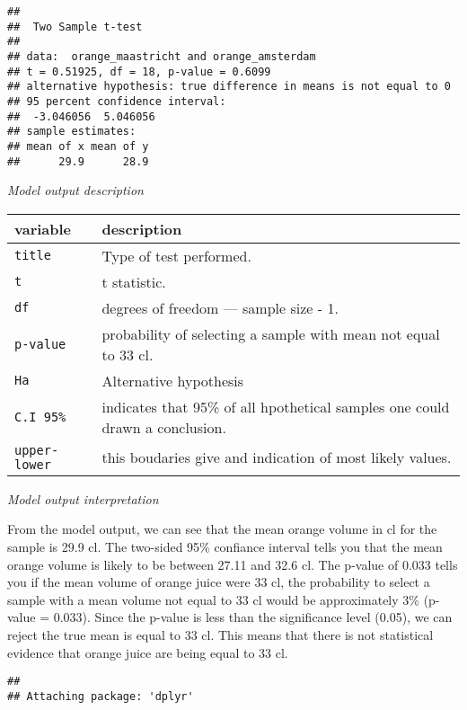\documentclass[
]{article}
\begin{document}
\begin{verbatim}
## 
##  Two Sample t-test
## 
## data:  orange_maastricht and orange_amsterdam
## t = 0.51925, df = 18, p-value = 0.6099
## alternative hypothesis: true difference in means is not equal to 0
## 95 percent confidence interval:
##  -3.046056  5.046056
## sample estimates:
## mean of x mean of y 
##      29.9      28.9
\end{verbatim}

\emph{Model output description}

\begin{longtable}[]{@{}
  >{\raggedright\arraybackslash}p{}
  >{\raggedright\arraybackslash}p{}@{}}
\toprule
variable & description \\
\midrule
\endhead
\texttt{title} & Type of test performed. \\
\texttt{t} & t statistic. \\
\texttt{df} & degrees of freedom --- sample size - 1. \\
\texttt{p-value} & probability of selecting a sample with mean not equal
to 33 cl. \\
\texttt{Ha} & Alternative hypothesis \\
\texttt{C.I\ 95\%} & indicates that 95\% of all hpothetical samples one
could drawn a conclusion. \\
\texttt{upper-lower} & this boudaries give and indication of most likely
values. \\
\bottomrule
\end{longtable}

\emph{Model output interpretation}

From the model output, we can see that the mean orange volume in cl for
the sample is 29.9 cl. The two-sided 95\% confiance interval tells you
that the mean orange volume is likely to be between 27.11 and 32.6 cl.
The p-value of 0.033 tells you if the mean volume of orange juice were
33 cl, the probability to select a sample with a mean volume not equal
to 33 cl would be approximately 3\% (p-value = 0.033). Since the p-value
is less than the significance level (0.05), we can reject the true mean
is equal to 33 cl. This means that there is not statistical evidence
that orange juice are being equal to 33 cl.

\begin{verbatim}
## 
## Attaching package: 'dplyr'
\end{verbatim}
\end{document}
